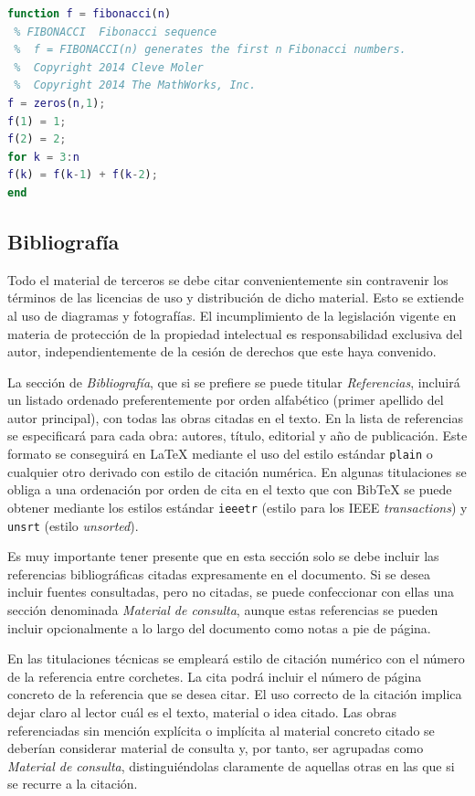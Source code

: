 \begin{lstlisting}[style=ruled,language=Matlab,caption={Ejemplo de script en Matlab},label=lst:matlab]
function f = fibonacci(n)
 % FIBONACCI  Fibonacci sequence
 %	f = FIBONACCI(n) generates the first n Fibonacci numbers.
 %	Copyright 2014 Cleve Moler
 %	Copyright 2014 The MathWorks, Inc.
f = zeros(n,1); 
f(1) = 1;
f(2) = 2;
for k = 3:n
f(k) = f(k-1) + f(k-2);
end
\end{lstlisting}






\subsection{Bibliografía}
Todo el material de terceros se debe citar convenientemente sin contravenir los términos de las licencias de uso y distribución de dicho material. Esto se extiende al uso de diagramas y fotografías. El incumplimiento de la legislación vigente en materia de protección de la propiedad intelectual es responsabilidad exclusiva del autor, independientemente de la cesión de derechos que este haya convenido.

La sección de \emph{Bibliografía}, que si se prefiere se puede titular \emph{Referencias}, incluirá un listado ordenado preferentemente por orden alfabético (primer apellido del autor principal), con todas las obras citadas en el texto. En la lista de referencias se especificará para cada obra: autores, título, editorial y año de publicación. Este formato se conseguirá en \LaTeX{} mediante el uso del estilo estándar \texttt{plain} o cualquier otro derivado con estilo de citación numérica. En algunas titulaciones se obliga a una ordenación por orden de cita en el texto que con Bib\TeX{} se puede obtener mediante los estilos estándar \texttt{ieeetr} (estilo para los IEEE \emph{transactions}) y \texttt{unsrt} (estilo \emph{unsorted}). 

Es muy importante tener presente que en esta sección solo se debe incluir las referencias bibliográficas citadas expresamente en el documento. Si se desea incluir fuentes consultadas, pero no citadas, se puede confeccionar con ellas una sección denominada \emph{Material de consulta}, aunque estas referencias se pueden incluir opcionalmente a lo largo del documento como notas a pie de página.

En las titulaciones técnicas se empleará estilo de citación numérico con el número de la referencia entre corchetes. La cita podrá incluir el número de página concreto de la referencia que se desea citar. El uso correcto de la citación implica dejar claro al lector cuál es el texto, material o idea citado. Las obras referenciadas sin mención explícita o implícita al material concreto citado se deberían considerar material de consulta y, por tanto, ser agrupadas como \emph{Material de consulta}, distinguiéndolas claramente de aquellas otras en las que si se recurre a la citación.

